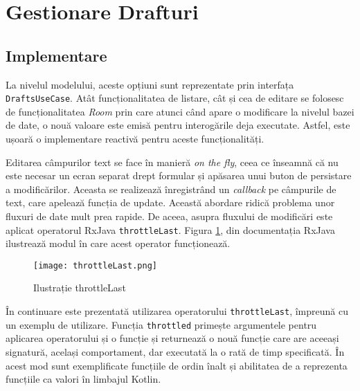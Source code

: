 \section{Gestionare Drafturi}\label{spec:drafts}

\subsection{Implementare}

La nivelul modelului, aceste opțiuni sunt reprezentate prin interfața \texttt{DraftsUseCase}. Atât funcționalitatea de listare, cât și cea de editare se folosesc de funcționalitatea \emph{Room} prin care atunci când apare o modificare la nivelul bazei de date, o nouă valoare este emisă pentru interogările deja executate. Astfel, este ușoară o implementare reactivă pentru aceste funcționalități.



Editarea câmpurilor text se face în manieră \emph{on the fly}, ceea ce înseamnă că nu este necesar un ecran separat drept formular și apăsarea unui buton de persistare a modificărilor. Aceasta se realizează înregistrând un \emph{callback} pe câmpurile de text, care apelează funcția de update. Această abordare ridică problema unor fluxuri de date mult prea rapide. De aceea, asupra fluxului de modificări este aplicat operatorul RxJava \texttt{throttleLast}. Figura \ref{fig:throttle}, din documentația RxJava \cite{ThrottleLast} ilustrează modul în care acest operator funcționează.

\begin{figure}[h]
  \centering
  \texttt{[image: throttleLast.png]}
  \caption{Ilustrație throttleLast}
  \label{fig:throttle}
\end{figure}

În continuare este prezentată utilizarea operatorului \texttt{throttleLast}, împreună cu un exemplu de utilizare. Funcția \texttt{throttled} primește argumentele pentru aplicarea operatorului și o funcție și returnează o nouă funcție care are aceeași signatură, același comportament, dar executată la o rată de timp specificată. În acest mod sunt exemplificate funcțiile de ordin înalt și abilitatea de a reprezenta funcțiile ca valori în limbajul Kotlin.


